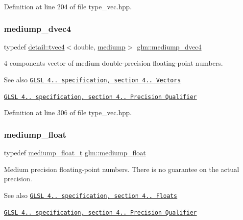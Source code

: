 Definition at line 204 of file type\+\_\+vec.\+hpp.

\mbox{\label{group__core__precision_gac61cf2fc2df895e5f277c978dace042a}} 
\subsubsection{\texorpdfstring{mediump\+\_\+dvec4}{mediump\_dvec4}}
{\footnotesize\ttfamily typedef \hyperlink{structglm_1_1detail_1_1tvec4}{detail\+::tvec4}$<$double, \hyperlink{namespaceglm_a0f04f086094c747d227af4425893f545a6416f3ea0c9025fb21ed50c4d6620482}{mediump}$>$ \hyperlink{group__core__precision_gac61cf2fc2df895e5f277c978dace042a}{glm\+::mediump\+\_\+dvec4}}

4 components vector of medium double-\/precision floating-\/point numbers.

\begin{DoxySeeAlso}{See also}
\href{http://www.opengl.org/registry/doc/GLSLangSpec.4.20.8.pdf}{\tt G\+L\+SL 4.. specification, section 4.. Vectors} 

\href{http://www.opengl.org/registry/doc/GLSLangSpec.4.20.8.pdf}{\tt G\+L\+SL 4.. specification, section 4.. Precision Qualifier} 
\end{DoxySeeAlso}


Definition at line 306 of file type\+\_\+vec.\+hpp.

\mbox{\label{group__core__precision_gac785826c039fe6c97c03b37c81c1a68e}} 
\subsubsection{\texorpdfstring{mediump\+\_\+float}{mediump\_float}}
{\footnotesize\ttfamily typedef \hyperlink{namespaceglm_aec127979a2b6edbf05b485cb4e8c47cc}{mediump\+\_\+float\+\_\+t} \hyperlink{group__core__precision_gac785826c039fe6c97c03b37c81c1a68e}{glm\+::mediump\+\_\+float}}

Medium precision floating-\/point numbers. There is no guarantee on the actual precision.

\begin{DoxySeeAlso}{See also}
\href{http://www.opengl.org/registry/doc/GLSLangSpec.4.20.8.pdf}{\tt G\+L\+SL 4.. specification, section 4.. Floats} 

\href{http://www.opengl.org/registry/doc/GLSLangSpec.4.20.8.pdf}{\tt G\+L\+SL 4.. specification, section 4.. Precision Qualifier} 
\end{DoxySeeAlso}


